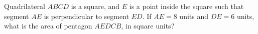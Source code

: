 Quadrilateral $ABCD$ is a square, and $E$ is a point inside the square such that segment $AE$ is perpendicular to segment $ED$. If $AE=8$ units and $DE=6$ units, what is the area of pentagon $AEDCB$, in square units?
